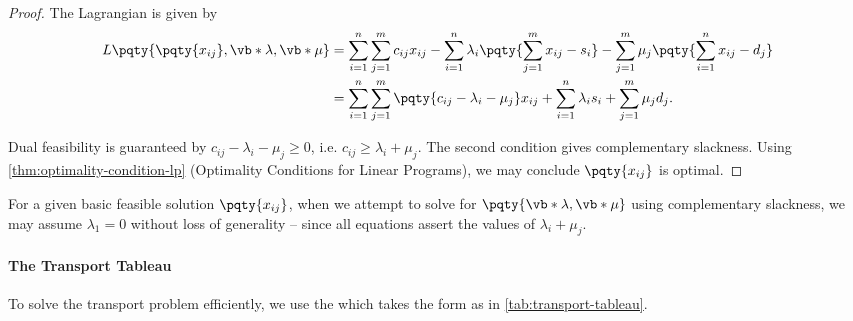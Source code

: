 \begin{proof}
    The Lagrangian is given by
    \begin{align*}
        L\pqty{\pqty{x_{ij}}, \vb*{\lambda}, \vb*{\mu}} &= \sum_{i = 1}^{n} \sum_{j = 1}^{m} c_{ij} x_{ij} - \sum_{i = 1}^{n} \lambda_i \pqty{\sum_{j = 1}^{m} x_{ij} - s_i} - \sum_{j = 1}^{m} \mu_j \pqty{\sum_{i = 1}^{n} x_{ij} - d_j} \\
        &= \sum_{i = 1}^{n} \sum_{j = 1}^{m} \pqty{c_{ij} - \lambda_i - \mu_j} x_{ij} + \sum_{i = 1}^{n} \lambda_i s_i + \sum_{j = 1}^{m} \mu_j d_j.
    \end{align*}

    Dual feasibility is guaranteed by \(c_{ij} - \lambda_i - \mu_j \geq 0\), i.e. \(c_{ij} \geq \lambda_i + \mu_j\). The second condition gives complementary slackness. Using \autoref{thm:optimality-condition-lp} (Optimality Conditions for Linear Programs), we may conclude \(\pqty{x_{ij}}\) is optimal.
\end{proof}

\begin{remark}
    For a given basic feasible solution \(\pqty{x_{ij}}\), when we attempt to solve for \(\pqty{\vb*{\lambda}, \vb*{\mu}}\) using complementary slackness, we may assume \(\lambda_1 = 0\) without loss of generality -- since all equations assert the values of \(\lambda_i + \mu_j\).
\end{remark}

\paragraph{The Transport Tableau}

To solve the transport problem efficiently, we use the  which takes the form as in \autoref{tab:transport-tableau}.

